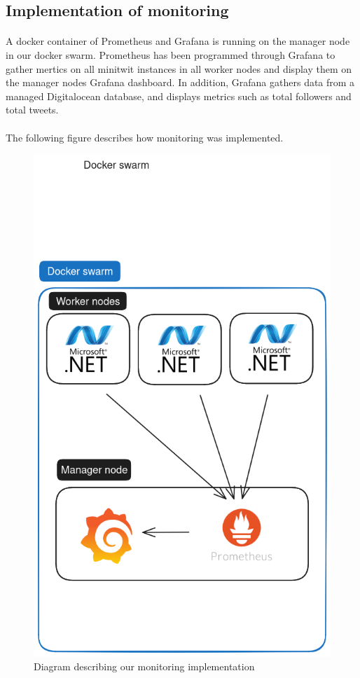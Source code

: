 \subsection{Implementation of monitoring} 
\paragraph{} A docker container of Prometheus and Grafana is running on the manager node in our docker swarm. Prometheus has been programmed through Grafana to gather mertics on all minitwit instances in all worker nodes and display them on the manager nodes Grafana dashboard. In addition, Grafana gathers data from a managed Digitalocean database, and displays metrics such as total followers and total tweets.
\paragraph{} The following figure describes how monitoring was implemented.
\begin{figure}[h]
	\centering
	\includegraphics[width=1\textwidth]{Monitoring2.png}
	\caption{Diagram describing our monitoring implementation}
	\label{fig:Monitoring2}
\end{figure}

